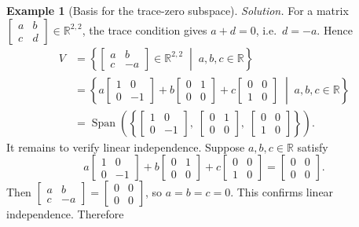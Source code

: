 \documentclass[11pt, a4paper, notitlepage]{report}
\theoremstyle{definition}
\newtheorem{example}[theorem]{Example}
\theoremstyle{remark}
\begin{document}
\begin{example}[Basis for the trace-zero subspace]
\emph{Solution.} For a matrix $\begin{bmatrix}a&b\\c&d\end{bmatrix}\in\mathbb{R}^{2,2}$, the trace condition gives $a + d = 0$, i.e.\ $d = -a$. Hence
\begin{align*}
  V &= \left\{ \begin{bmatrix}a&b\\c&-a\end{bmatrix} \in \mathbb{R}^{2,2} \;\middle|\; a,b,c\in\mathbb{R} \right\} \\
    &= \left\{ a\begin{bmatrix}1&0\\0&-1\end{bmatrix} + b\begin{bmatrix}0&1\\0&0\end{bmatrix} + c\begin{bmatrix}0&0\\1&0\end{bmatrix} \;\middle|\; a,b,c\in\mathbb{R} \right\} \\
    &= \operatorname{Span}\!\left(\left\{\begin{bmatrix}1&0\\0&-1\end{bmatrix},\; \begin{bmatrix}0&1\\0&0\end{bmatrix},\; \begin{bmatrix}0&0\\1&0\end{bmatrix}\right\}\right).
\end{align*}
It remains to verify linear independence. Suppose $a,b,c\in\mathbb{R}$ satisfy
\[
  a\begin{bmatrix}1&0\\0&-1\end{bmatrix} + b\begin{bmatrix}0&1\\0&0\end{bmatrix} + c\begin{bmatrix}0&0\\1&0\end{bmatrix} = \begin{bmatrix}0&0\\0&0\end{bmatrix}.
\]
Then $\begin{bmatrix}a&b\\c&-a\end{bmatrix} = \begin{bmatrix}0&0\\0&0\end{bmatrix}$, so $a=b=c=0$. This confirms linear independence. Therefore

\end{example}
\end{document}
